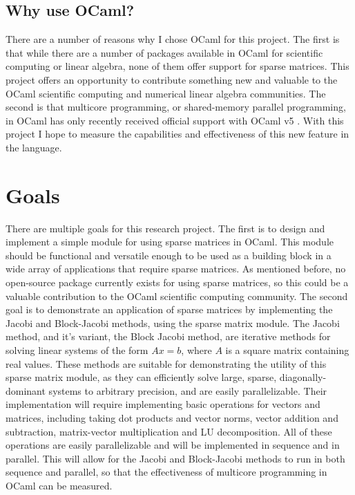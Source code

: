 \documentclass[pageno]{jpaper}
\begin{document}
\begin{doublespacing}
\subsection{Why use OCaml?}
There are a number of reasons why I chose OCaml for this project. The first is that while there are a number of packages available in OCaml for scientific computing or linear algebra, none of them offer support for sparse matrices. This project offers an opportunity to contribute something new and valuable to the OCaml scientific computing and numerical linear algebra communities. The second is that multicore programming, or shared-memory parallel programming, in OCaml has only recently received official support with OCaml v5 \cite{ocaml-v5}. With this project I hope to measure the capabilities and effectiveness of this new feature in the language.

\section{Goals}
There are multiple goals for this research project. The first is to design and implement a simple module for using sparse matrices in OCaml. This module should be functional and versatile enough to be used as a building block in a wide array of applications that require sparse matrices. As mentioned before, no open-source package currently exists for using sparse matrices, so this could be a valuable contribution to the OCaml scientific computing community. The second goal is to demonstrate an application of sparse matrices by implementing the Jacobi and Block-Jacobi methods, using the sparse matrix module. The Jacobi method, and it's variant, the Block Jacobi method, are iterative methods for solving linear systems of the form $Ax = b$, where $A$ is a square matrix containing real values. These methods are suitable for demonstrating the utility of this sparse matrix module, as they can efficiently solve large, sparse, diagonally-dominant systems to arbitrary precision, and are easily parallelizable. Their implementation will require implementing basic operations for vectors and matrices, including taking dot products and vector norms, vector addition and subtraction, matrix-vector multiplication and LU decomposition. All of these operations are easily parallelizable and will be implemented in sequence and in parallel. This will allow for the Jacobi and Block-Jacobi methods to run in both sequence and parallel, so that the effectiveness of multicore programming in OCaml can be measured.


\end{doublespacing}
\end{document}
